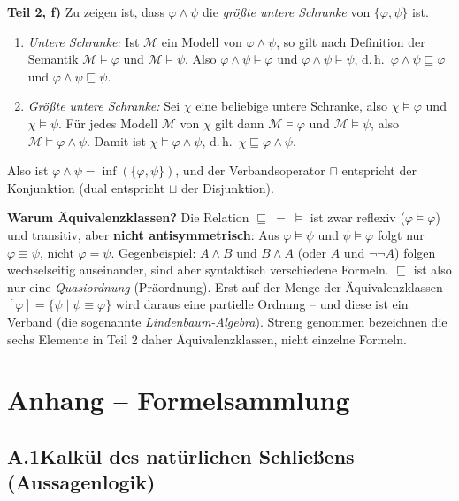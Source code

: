 \begin{loesung}
\textbf{Teil 2, f)} Zu zeigen ist, dass $\varphi\wedge\psi$ die \emph{größte untere Schranke} von $\{\varphi,\psi\}$ ist.
\begin{enumerate}[1.]
  \item \textit{Untere Schranke:} Ist $\mathcal{M}$ ein Modell von $\varphi\wedge\psi$, so gilt nach Definition der Semantik $\mathcal{M}\models\varphi$ und $\mathcal{M}\models\psi$. Also $\varphi\wedge\psi\models\varphi$ und $\varphi\wedge\psi\models\psi$, d.\,h.\ $\varphi\wedge\psi\sqsubseteq\varphi$ und $\varphi\wedge\psi\sqsubseteq\psi$.
  \item \textit{Größte untere Schranke:} Sei $\chi$ eine beliebige untere Schranke, also $\chi\models\varphi$ und $\chi\models\psi$. Für jedes Modell $\mathcal{M}$ von $\chi$ gilt dann $\mathcal{M}\models\varphi$ und $\mathcal{M}\models\psi$, also $\mathcal{M}\models\varphi\wedge\psi$. Damit ist $\chi\models\varphi\wedge\psi$, d.\,h.\ $\chi\sqsubseteq\varphi\wedge\psi$.
\end{enumerate}
Also ist $\varphi\wedge\psi=\inf(\{\varphi,\psi\})$, und der Verbandsoperator $\sqcap$ entspricht der Konjunktion (dual entspricht $\sqcup$ der Disjunktion).

\textbf{Warum Äquivalenzklassen?} Die Relation $\sqsubseteq\ =\ \models$ ist zwar reflexiv ($\varphi\models\varphi$) und transitiv, aber \textbf{nicht antisymmetrisch}: Aus $\varphi\models\psi$ und $\psi\models\varphi$ folgt nur $\varphi\equiv\psi$, nicht $\varphi=\psi$. Gegenbeispiel: $A\wedge B$ und $B\wedge A$ (oder $A$ und $\neg\neg A$) folgen wechselseitig auseinander, sind aber syntaktisch verschiedene Formeln. $\sqsubseteq$ ist also nur eine \emph{Quasiordnung} (Präordnung). Erst auf der Menge der Äquivalenzklassen $[\varphi]=\{\psi \mid \psi\equiv\varphi\}$ wird daraus eine partielle Ordnung -- und diese ist ein Verband (die sogenannte \emph{Lindenbaum-Algebra}). Streng genommen bezeichnen die sechs Elemente in Teil 2 daher Äquivalenzklassen, nicht einzelne Formeln.
\end{loesung}

\newpage
\section*{Anhang -- Formelsammlung}\label{anhang}

\subsection*{A.1\quad Kalkül des natürlichen Schließens (Aussagenlogik)}

